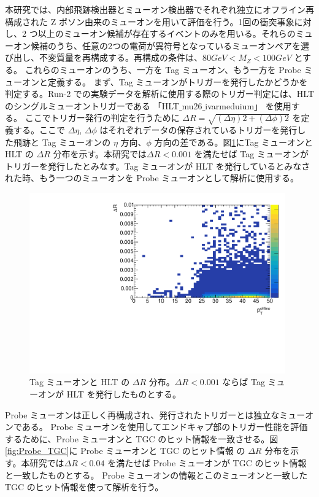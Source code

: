 本研究では、内部飛跡検出器とミューオン検出器でそれぞれ独立にオフライン再構成された Z ボソン由来のミューオンを用いて評価を行う。1回の衝突事象に対し、2 つ以上のミューオン候補が存在するイベントのみを用いる。それらのミューオン候補のうち、任意の2つの電荷が異符号となっているミューオンペアを選び出し、不変質量を再構成する。再構成の条件は、$80 GeV < M_Z < 100 GeV$ とする。
これらのミューオンのうち、一方を Tag ミューオン、もう一方を Probe ミューオンと定義する。
まず、Tag ミューオンがトリガーを発行したかどうかを判定する。Run-2 での実験データを解析に使用する際のトリガー判定には、HLT のシングルミューオントリガーである 「HLT$\_$mu26$\_$ivarmeduium」 を使用する。
ここでトリガー発行の判定を行うために $\Delta R = \sqrt{(\Delta \eta)2 + (\Delta \phi)2}$ を定義する。ここで $\Delta \eta$, $\Delta \phi$ はそれぞれデータの保存されているトリガーを発行した飛跡と Tag ミューオンの $\eta$ 方向、$\phi$ 方向の差である。図\ref{fig:tag_HLT}にTag ミューオンと HLT の $\Delta R$ 分布を示す。本研究では$\Delta R < 0.001$ を満たせば Tag ミューオンがトリガーを発行したとみなす。Tag ミューオンが HLT を発行しているとみなされた時、もう一つのミューオンを Probe ミューオンとして解析に使用する。

\begin{figure}[tb]
  \centering
  \includegraphics[clip, width=11cm]{fig/3/dR_tag_HLT.pdf}
  \caption{Tag ミューオンと HLT の $\Delta R$ 分布。$\Delta R < 0.001$ ならば Tag ミューオンが HLT を発行したものとする。}
  \label{fig:tag_HLT}
\end{figure}

Probe ミューオンは正しく再構成され、発行されたトリガーとは独立なミューオンである。
Probe ミューオンを使用してエンドキャプ部のトリガー性能を評価するために、Probe ミューオンと TGC のヒット情報を一致させる。図\ref{fig:Probe_TGC}に Probe ミューオンと TGC のヒット情報 の $\Delta R$ 分布を示す。本研究では$\Delta R < 0.04$ を満たせば Probe ミューオンが TGC のヒット情報と一致したものとする。
Probe ミューオンの情報とこのミューオンと一致したTGC のヒット情報を使って解析を行う。

